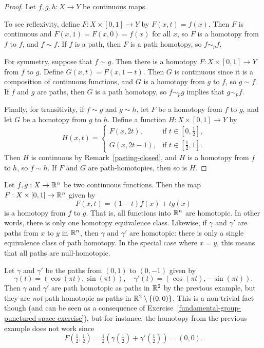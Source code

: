 \begin{proof}
  Let $f, g, h : X \to Y$ be continuous maps.
  
  To see reflexivity, define $F : X \times [0,1] \to Y$ by $F(x,t) = f(x)$. Then $F$ is continuous and $F(x,1) = F(x,0) = f(x)$ for all $x$, so $F$ is a homotopy from $f$ to $f$, and $f \sim f$. If $f$ is a path, then $F$ is a path homotopy, so $f \sim_p f$.
  
  For symmetry, suppose that $f \sim g$. Then there is a homotopy $F : X \times [0,1] \to Y$ from $f$ to $g$. Define $G(x,t) = F(x,1-t)$. Then $G$ is continuous since it is a composition of continuous functions, and $G$ is a homotopy from $g$ to $f$, so $g \sim f$. If $f$ and $g$ are paths, then $G$ is a path homotopy, so $f \sim_p g$ implies that $g \sim_p f$.
  
  Finally, for transitivity, if $f \sim g$ and $g \sim h$, let $F$ be a homotopy from $f$ to $g$, and let $G$ be a homotopy from $g$ to $h$. Define a function $H : X \times [0,1] \to Y$ by
  \[
    H(x,t) = \begin{cases} F(x,2t),& \text{if $t \in [0,\tfrac{1}{2}]$,} \\G(x,2t-1), & \text{if $t \in [\tfrac{1}{2},1]$.} \end{cases}
  \]
  Then $H$ is continuous by Remark~\ref{pasting-closed}, and $H$ is a homotopy from $f$ to $h$, so $f \sim h$. If $F$ and $G$ are path-homotopies, then so is $H$.
\end{proof}
\begin{example}
  \label{euclidean-path-homotopy}
  Let $f, g : X \to \mathbb{R}^n$ be two continuous functions. Then the map $F : X \times [0,1] \to \mathbb{R}^n$ given by
  \[
    F(x,t) = (1-t)f(x) + tg(x)
  \]
  is a homotopy from $f$ to $g$. That is, all functions into $\mathbb{R}^n$ are homotopic. In other words, there is only one homotopy equivalence class. Likewise, if $\gamma$ and $\gamma'$ are paths from $x$ to $y$ in $\mathbb{R}^n$, then $\gamma$ and $\gamma'$ are homotopic: there is only a single equivalence class of path homotopy. In the special case where $x = y$, this means that all paths are null-homotopic.
\end{example}
\begin{example}
  Let $\gamma$ and $\gamma'$ be the paths from $(0,1)$ to $(0,-1)$ given by
  \[
    \gamma(t) = (\cos (\pi t), \sin (\pi t)), \quad \gamma'(t) = (\cos(\pi t), -\sin(\pi t)).
  \]
  Then $\gamma$ and $\gamma'$ are path homotopic as paths in $\mathbb{R}^2$ by the previous example, but they are \emph{not} path homotopic as paths in $\mathbb{R}^2 \setminus \{(0,0)\}$. This is a non-trivial fact though (and can be seen as a consequence of Exercise~\ref{fundamental-group-punctured-space-exercise}), but for instance, the homotopy from the previous example does not work since
  \[
    F(\tfrac{1}{2},\tfrac{1}{2}) = \tfrac{1}{2}(\gamma(\tfrac{1}{2}) + \gamma'(\tfrac{1}{2})) = (0,0).
  \]
\end{example}
